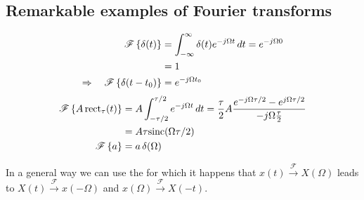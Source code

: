 	\subsection{Remarkable examples of Fourier transforms}
		\begin{align*}
			\mathscr{F}\left\{ \delta(t) \right\} & = \int_{-\infty}^\infty \delta(t) e^{-j\Omega t}  \, dt = e^{-j\Omega 0} \\ & = 1 \\
			\Rightarrow \quad \mathscr{F}\left\{ \delta(t - t_0) \right\} & = e^{-j\Omega t_0}
		\end{align*}
		\begin{align*}
			\mathscr{F}\left\{ A \, \textrm{rect}_\tau(t) \right\}	& =	 A \int_{-\tau/2}^{\tau/2} e ^{-j\Omega t} \, dt = \frac \tau 2 A \frac{e^{-j\Omega \tau/2} - e^{j\Omega \tau/2}}{-j\Omega \frac \tau 2} \\ & = A \tau \textrm{sinc} (\Omega \tau/2) \\
			\mathscr{F}\left\{ a \right\} & = a \, \delta(\Omega)
		\end{align*}
	
		In a general way we can use the  for which it happens that $x(t) \xrightarrow{\mathscr{F}} X(\Omega)$ leads to $X(t) \xrightarrow{\mathscr{F}} x(-\Omega)$ and $x(\Omega) \xrightarrow{\mathscr{F}} X(-t)$.
	

	
	
	
	
	
	
	